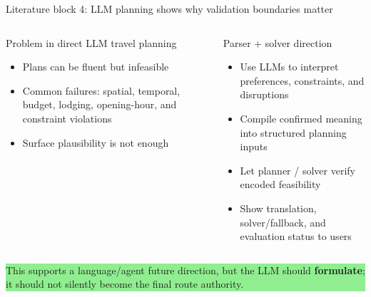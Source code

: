 \documentclass[aspectratio=169,10pt]{beamer}
\newcommand{\smallcite}[1]{\vspace{0.15em}{\footnotesize\textcolor{DarkGray}{#1}}}
\begin{document}
\begin{frame}{Literature block 4: LLM planning shows why validation boundaries matter}
\begin{columns}[T,onlytextwidth]
\begin{block}{Problem in direct LLM travel planning}
\begin{itemize}
  \item Plans can be fluent but infeasible
  \item Common failures: spatial, temporal, budget, lodging, opening-hour, and constraint violations
  \item Surface plausibility is not enough
\end{itemize}
\smallcite{TravelPlanner; TravelEval; TripScore}
\end{block}

\begin{block}{Parser + solver direction}
\begin{itemize}
  \item Use LLMs to interpret preferences, constraints, and disruptions
  \item Compile confirmed meaning into structured planning inputs
  \item Let planner / solver verify encoded feasibility
  \item Show translation, solver/fallback, and evaluation status to users
\end{itemize}
\smallcite{LOGIC-LM; To the Globe / TTG; TRIP-PAL; LLMAP}
\end{block}
\end{columns}

\vspace{0.45em}
\centering
\colorbox{LightGreen}{\parbox{0.86\textwidth}{\centering\small This supports a language/agent future direction, but the LLM should \textbf{formulate}; it should not silently become the final route authority.}}
\end{frame}
\end{document}
